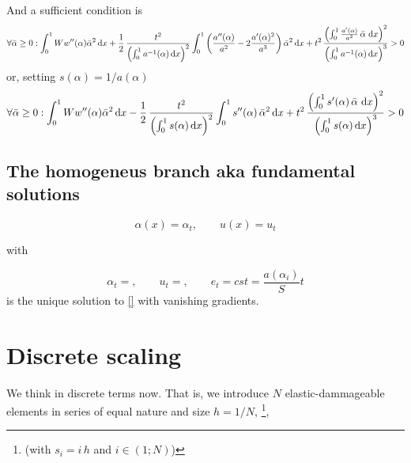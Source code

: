 \documentclass[]{article}
\renewcommand*\d{\mathop{}\!\mathrm{d}} %
\begin{document}
And a sufficient condition is
\begin{align}
\forall \bar{\alpha} \ge0: \int_0^1 W w''(\alpha) \bar{\alpha}^2 \d x +
 \frac12  \, \frac{\load^2}{\left( \int_0^1 a^{-1}(\alpha) \d x \right)^2}
\int_0^1 
\left(
\frac{a''(\alpha)}{a^2 } -2\frac{a'(\alpha)^2}{a^3 } 
\right)
\bar{\alpha}^2 \d x
+
\load^2 \, \frac{\left( \int_0^1 \frac{a'(\alpha)}{a^2} \, \bar{\alpha} \, \d x \right)^2 }{\left( \int_0^1 a^{-1}(\alpha) \d x \right)^3}
>0
\end{align} 
or, setting $s(\alpha)=1/a(\alpha)$
\begin{align}
\label{eq:second_varia}
\forall \bar{\alpha} \ge0: \int_0^1 W w''(\alpha) \bar{\alpha}^2 \d x -
 \frac12  \, \frac{\load^2}{\left( \int_0^1 s(\alpha) \d x \right)^2}
\int_0^1 s''(\alpha) \, \bar{\alpha}^2 \d x
+
\load^2 \, \frac{\left( \int_0^1 s'(\alpha) \, \bar{\alpha} \, \d x \right)^2 }{\left( \int_0^1 s(\alpha) \d x \right)^3}
>0
\end{align} 

\subsection{The homogeneus branch aka fundamental solutions}

\begin{equation}
    \label{eqn:homogeneous}
    \alpha(x) = \alpha_t, \qquad u(x)=u_t
\end{equation}

with

\begin{equation}
    \label{eqn:homogeneous}
    \alpha_t=, \qquad u_t=, \qquad e_t = cst = \frac{a(\alpha_i)}{S}t
\end{equation}
is the unique solution to \eqref{} with vanishing gradients.


%
%
%
%
%
%
%
\section{Discrete scaling} \label{sec:going_discrete}
%
%
%
%
%
%
We think in discrete terms now. 
That is, 
we introduce $N$  elastic-dammageable elements in series of equal nature and size $h=1/N$, \footnote{(with $s_i=i \, h$ and $i \in (1;N)$)}, 
\end{document}
